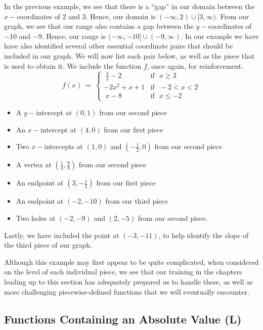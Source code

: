 \documentclass[12pt]{book}
\theoremstyle{definition}
\begin{document}
In the previous example, we see that there is a ``gap'' in our domain between the $x-$coordinates of $2$ and $3$.  Hence, our domain is $(-\infty,2)\cup[3,\infty)$.  From our graph, we see that our range also contains a gap between the $y-$coordinates of $-10$ and $-9$.  Hence, our range is $(-\infty,-10]\cup(-9,\infty)$.
In our example we have have also identified several other essential coordinate pairs that should be included in our graph.  We will now list each pair below, as well as the piece that is used to obtain it.  We include the function $f$, once again, for reinforcement.
\newpage
\[ f(x)~=~
	\begin{cases} 
      ~\frac{x}{2}-2 & \text{if~~} x\geq 3\\
			-2x^2+x+1 & \text{if~~} -2<x<2\\
			~x-8 & \text{if~~} x\leq -2
  \end{cases}
\]
\begin{itemize}
\item A $y-$intercept at $(0,1)$ from our second piece
\item An $x-$intercept at $(4,0)$ from our first piece
\item Two $x-$intercepts at $(1,0)$ and $\left(-\frac{1}{2},0\right)$ from our second piece
\item A vertex at $\left(\frac{1}{4},\frac{9}{8}\right)$ from our second piece
\item An endpoint at $\left(3,-\frac{1}{2}\right)$ from our first piece
\item An endpoint at $(-2,-10)$ from our third piece
\item Two holes at $(-2,-9)$ and $(2,-5)$ from our second piece.
\end{itemize}
Lastly, we have included the point at $(-3,-11)$, to help identify the slope of the third piece of our graph.\par
Although this example may first appear to be quite complicated, when considered on the level of each individual piece, we see that our training in the chapters leading up to this section has adequately prepared us to handle these, as well as more challenging piecewise-defined functions that we will eventually encounter.
\subsection{Functions Containing an Absolute Value (L)}
\end{document}
